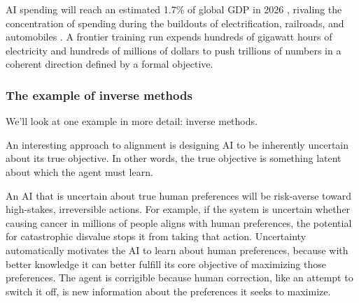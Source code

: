 AI spending will reach an estimated 1.7\% of global GDP in 2026 \citep{gartner2025gartner}, rivaling the concentration of spending during the buildouts of electrification, railroads, and automobiles \citep{fogel1964railroads, nye1992electrifying}. A frontier training run expends hundreds of gigawatt hours of electricity and hundreds of millions of dollars to push trillions of numbers in a coherent direction defined by a formal objective. 







\subsubsection{The example of inverse methods}

We'll look at one example in more detail: inverse methods.

An interesting approach to alignment is designing AI to be inherently uncertain about its true objective. In other words, the true objective is something latent about which the agent must learn.

An AI that is uncertain about true human preferences will be risk-averse toward high-stakes, irreversible actions. For example, if the system is uncertain whether causing cancer in millions of people aligns with human preferences, the potential for catastrophic disvalue stops it from taking that action. Uncertainty automatically motivates the AI to learn about human preferences, because with better knowledge it can better fulfill its core objective of maximizing those preferences. The agent is corrigible because human correction, like an attempt to switch it off, is new information about the preferences it seeks to maximize. 

